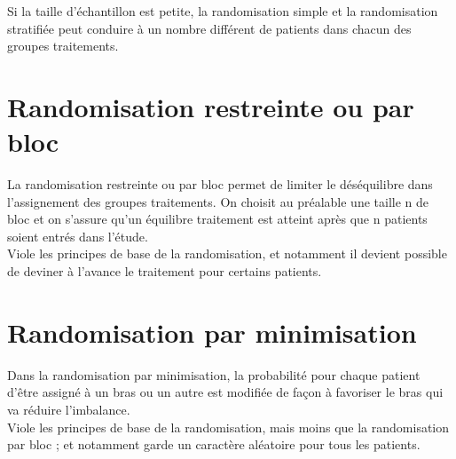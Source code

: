 Si la taille d’échantillon est petite, la randomisation simple et la randomisation stratifiée peut conduire à un nombre différent de patients dans chacun des groupes traitements.

\section{Randomisation restreinte ou par bloc}
La randomisation restreinte ou par bloc permet de limiter le déséquilibre dans l’assignement des groupes traitements. On choisit au préalable une taille n de bloc et on s’assure qu’un équilibre traitement est atteint après que n patients soient entrés dans l’étude.\\

 
Viole les principes de base de la randomisation, et notamment il devient possible de deviner à l’avance le traitement pour certains patients.


\section{Randomisation par minimisation}

Dans la randomisation par minimisation, la probabilité pour chaque patient d’être assigné à un bras ou un autre est modifiée de façon à favoriser le bras qui va réduire l’imbalance.\\

 
Viole les principes de base de la randomisation, mais moins que la randomisation par bloc ; et notamment garde un caractère aléatoire pour tous les patients.


